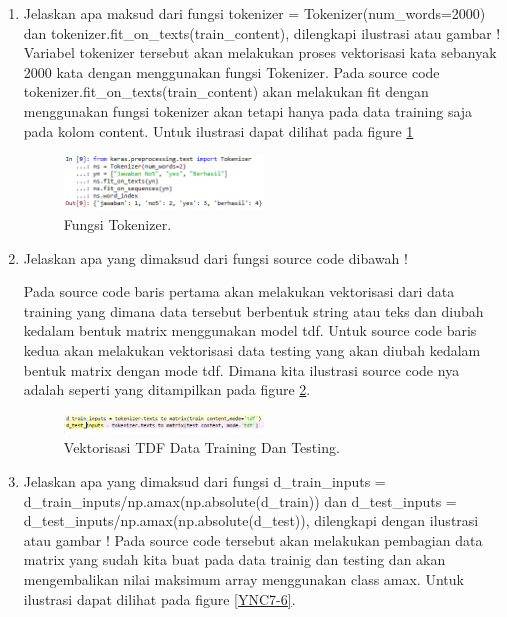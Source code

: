 \begin{enumerate}
\item Jelaskan apa maksud dari fungsi tokenizer = Tokenizer(num\_words=2000) dan tokenizer.fit\_on\_texts(train\_content), dilengkapi ilustrasi atau gambar !
	\subitem Variabel tokenizer tersebut akan melakukan proses vektorisasi kata sebanyak 2000 kata dengan menggunakan fungsi Tokenizer. Pada source code tokenizer.fit\_on\_texts(train\_content) akan melakukan fit dengan menggunakan fungsi tokenizer akan tetapi hanya pada data training saja pada kolom content. Untuk ilustrasi dapat dilihat pada figure \ref{YNC7-4}
	\begin{figure}[!htbp!]
		\centerline{\includegraphics[width=0.5\textwidth]{figures/YN/Chapter7/YNC7-4.png}}
		\caption{Fungsi Tokenizer.}
		\label{YNC7-4}
	\end{figure}

\item Jelaskan apa yang dimaksud dari fungsi source code dibawah !
	
	\subitem Pada source code baris pertama akan melakukan vektorisasi dari data training yang dimana data tersebut berbentuk string atau teks dan diubah kedalam bentuk matrix menggunakan model tdf. Untuk source code baris kedua akan melakukan vektorisasi data testing yang akan diubah kedalam bentuk matrix dengan mode tdf. Dimana kita ilustrasi source code nya adalah seperti yang ditampilkan pada figure \ref{YNC7-5}.

	\begin{figure}[!htbp!]
		\centerline{\includegraphics[width=0.5\textwidth]{figures/YN/Chapter7/YNC7-5.png}}
		\caption{Vektorisasi TDF Data Training Dan Testing.}
		\label{YNC7-5}
	\end{figure}

\item Jelaskan apa yang dimaksud dari fungsi d\_train\_inputs = d\_train\_inputs/np.amax(np.absolute(d\_train)) dan  d\_test\_inputs = d\_test\_inputs/np.amax(np.absolute(d\_test)), dilengkapi dengan ilustrasi atau gambar !
	\subitem Pada source code tersebut akan melakukan pembagian data matrix yang sudah kita buat pada data trainig dan testing dan akan mengembalikan nilai maksimum array menggunakan class amax. Untuk ilustrasi dapat dilihat pada figure \ref{YNC7-6}.


\end{enumerate}
